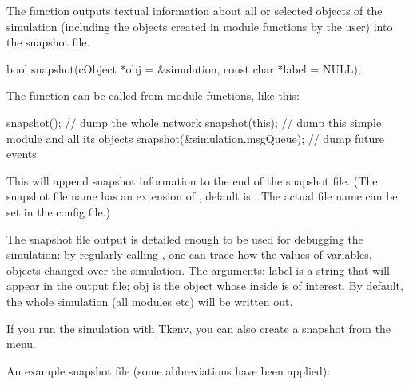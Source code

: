 The  function outputs textual information about all
or selected objects of the simulation (including the objects created
in module functions by the user) into the snapshot file.

\begin{cpp}
bool snapshot(cObject *obj = &simulation, const char *label = NULL);
\end{cpp}

The function can be called from module functions, like this:

\begin{cpp}
snapshot();     // dump the whole network
snapshot(this); // dump this simple module and all its objects
snapshot(&simulation.msgQueue); // dump future events
\end{cpp}

This will append snapshot information to the end of the snapshot file.
(The snapshot file name has an extension of , default is
. The actual file name can be set in the
config file.)

The snapshot file output is detailed enough to be used for debugging
the simulation: by regularly calling , one can trace
how the values of variables, objects changed over the simulation.
The arguments: label is a string that will appear in the output
file; obj is the object whose inside is of interest. By default,
the whole simulation (all modules etc) will be written out.

If you run the simulation with Tkenv, you can also create a snapshot
from the menu.

An example snapshot file (some abbreviations have been applied):


